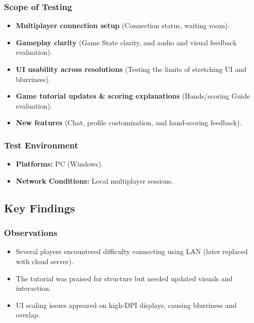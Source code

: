 \documentclass{article}
\begin{document}
\subsubsection{Scope of Testing}
\begin{itemize}
    \item \textbf{Multiplayer connection setup} (Connection status, waiting room).
    \item \textbf{Gameplay clarity} (Game State clarity, and audio and visual feedback evaluation).
    \item \textbf{UI usability across resolutions} (Testing the limits of stretching UI and blurriness).
    \item \textbf{Game tutorial updates \& scoring explanations} (Hands/scoring Guide evaluation).
    \item \textbf{New features} (Chat, profile customization, and hand-scoring feedback).
\end{itemize}

\subsubsection{Test Environment}
\begin{itemize}
    \item \textbf{Platforms:} PC (Windows).
    \item \textbf{Network Conditions:} Local multiplayer sessions.
\end{itemize}

\subsection{Key Findings}

\subsubsection{Observations}
\begin{itemize}
    \item Several players encountered difficulty connecting using LAN (later replaced with cloud server).
    \item The tutorial was praised for structure but needed updated visuals and interaction.
    \item UI scaling issues appeared on high-DPI displays, causing blurriness and overlap.
\end{itemize}
\end{document}
